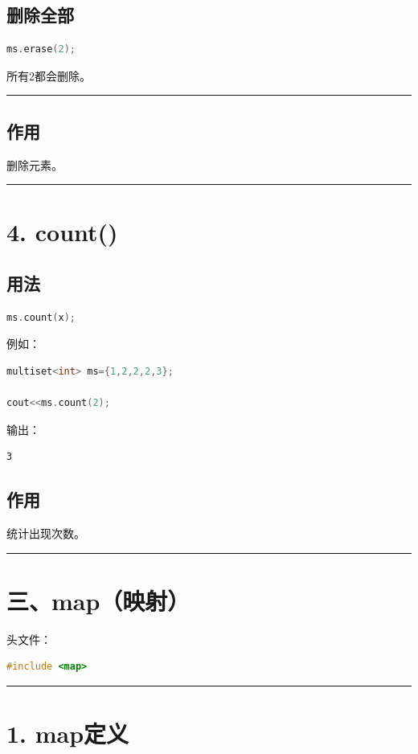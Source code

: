 \documentclass[9pt,twocolumn]{extarticle}
\begin{document}
\subsection{删除全部}
\begin{lstlisting}[language=C++]
ms.erase(2);
\end{lstlisting}
所有2都会删除。

\noindent\rule{\linewidth}{0.4pt}

\subsection{作用}
删除元素。

\noindent\rule{\linewidth}{0.4pt}

\section{4. count()}

\subsection{用法}
\begin{lstlisting}[language=C++]
ms.count(x);
\end{lstlisting}
例如：
\begin{lstlisting}[language=C++]
multiset<int> ms={1,2,2,2,3};

cout<<ms.count(2);
\end{lstlisting}
输出：
\begin{lstlisting}
3
\end{lstlisting}

\subsection{作用}
统计出现次数。

\noindent\rule{\linewidth}{0.4pt}

\section{三、map（映射）}

头文件：
\begin{lstlisting}[language=C++]
#include <map>
\end{lstlisting}

\noindent\rule{\linewidth}{0.4pt}

\section{1. map定义}
\end{document}
